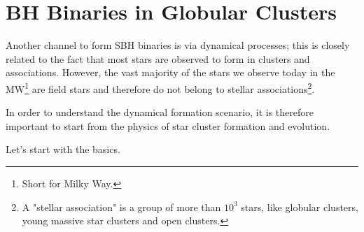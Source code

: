 \section{BH Binaries in Globular Clusters}
Another channel to form SBH binaries is via dynamical processes; this is closely related to the fact that most stars are observed to form in clusters and associations. However, the vast majority of the stars we observe today in the MW\footnote{Short for Milky Way.} are ﬁeld stars and therefore do not belong to stellar associations\footnote{A "stellar association" is a group of more than $10^{3}$ stars, like globular clusters, young massive star clusters and open clusters.}.
\par In order to understand the dynamical formation scenario, it is therefore important to start from the physics of star cluster formation and
evolution.
\par Let's start with the basics.
